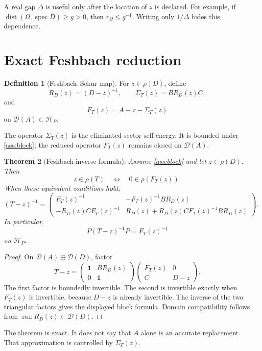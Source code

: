 \documentclass[11pt]{article}
\newtheorem{theorem}{Theorem}[section]
\theoremstyle{definition}
\newtheorem{definition}[theorem]{Definition}
\theoremstyle{remark}
\newcommand{\cD}{\mathcal D}
\newcommand{\cH}{\mathcal H}
\newcommand{\1}{\mathbf 1}
\newcommand{\dist}{\operatorname{dist}}
\newcommand{\spec}{\operatorname{spec}}
\begin{document}
A real gap \(\Delta\) is useful only after the location of \(z\) is
declared.  For example, if
\(\dist(\Omega,\spec D)\geq g>0\), then
\(r_\Omega\leq g^{-1}\).  Writing only \(1/\Delta\) hides this dependence.

\section{Exact Feshbach reduction}
\label{sec:feshbach}

\begin{definition}[Feshbach--Schur map]
For \(z\in\rho(D)\), define
\[
  R_D(z)=(D-z)^{-1},
  \qquad
  \Sigma_T(z)=BR_D(z)C,
\]
and
\[
  F_T(z)=A-z-\Sigma_T(z)
\]
on \(\cD(A)\subset\cH_P\).
\end{definition}
The operator \(\Sigma_T(z)\) is the eliminated-sector self-energy.  It is
bounded under \cref{ass:block}; the reduced operator \(F_T(z)\) remains
closed on \(\cD(A)\).

\begin{theorem}[Feshbach inverse formula]
\label{thm:feshbach}
Assume \cref{ass:block} and let \(z\in\rho(D)\).  Then
\[
 z\in\rho(T)
 \quad\Longleftrightarrow\quad
 0\in\rho(F_T(z)).
\]
When these equivalent conditions hold,
\[
(T-z)^{-1}
=
\begin{pmatrix}
F_T(z)^{-1}
&
-F_T(z)^{-1}BR_D(z)
\\[0.3em]
-R_D(z)CF_T(z)^{-1}
&
R_D(z)+R_D(z)CF_T(z)^{-1}BR_D(z)
\end{pmatrix}.
\]
In particular,
\[
  P(T-z)^{-1}P=F_T(z)^{-1}
\]
on \(\cH_P\).
\end{theorem}

\begin{proof}
On \(\cD(A)\oplus\cD(D)\), factor
\[
T-z
=
\begin{pmatrix}
\1&BR_D(z)\\ 0&\1
\end{pmatrix}
\begin{pmatrix}
F_T(z)&0\\ C&D-z
\end{pmatrix}.
\]
The first factor is boundedly invertible.  The second is invertible exactly
when \(F_T(z)\) is invertible, because \(D-z\) is already invertible.  The
inverse of the two triangular factors gives the displayed block formula.
Domain compatibility follows from
\(\operatorname{ran}R_D(z)\subset\cD(D)\).
\end{proof}

The theorem is exact.  It does not say that \(A\) alone is an accurate
replacement.  That approximation is controlled by \(\Sigma_T(z)\).
\end{document}
